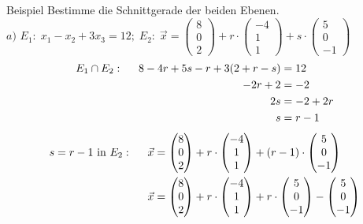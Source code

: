 \documentclass{article}
\begin{document}
\begin{boxx}[DarkBlue]{Beispiel}
    Bestimme die Schnittgerade der beiden Ebenen.\\

    $a)$\hspace{3mm} $E_1:\; x_1 - x_2 + 3x_3 = 12;\; E_2:\;\vec{x} = \begin{pmatrix}8\\0\\2\end{pmatrix}+ r\cdot \begin{pmatrix}-4\\1\\1\end{pmatrix} + s \cdot \begin{pmatrix}5\\0\\-1\end{pmatrix}$
    \begin{align*}
        E_1 \cap E_2: \hspace*{5mm}8-4r +5s -r + 3(2+r-s) &= 12 \\
        -2r + 2 &= -2 \\
        2s &= -2+2r \\
        s &= r - 1
    \end{align*}
    \begin{align*}
        s = r - 1 \text{ in } E_2: \hspace*{5mm} \vec{x} &= \begin{pmatrix}8\\0\\2\end{pmatrix}+ r\cdot \begin{pmatrix}-4\\1\\1\end{pmatrix} + (r-1) \cdot \begin{pmatrix}5\\0\\-1\end{pmatrix} \\
        \vec{x} &= \begin{pmatrix}8\\0\\2\end{pmatrix}+ r\cdot \begin{pmatrix}-4\\1\\1\end{pmatrix} + r \cdot \begin{pmatrix}5\\0\\-1\end{pmatrix} - \begin{pmatrix}5\\0\\-1\end{pmatrix} \\

\end{align*}
\end{boxx}
\end{document}
